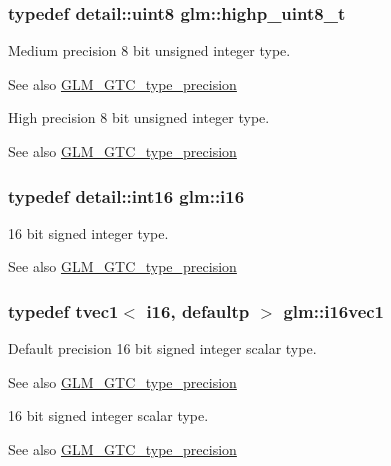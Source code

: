 \subsubsection[{highp\+\_\+uint8\+\_\+t}]{\setlength{\rightskip}{0pt plus 5cm}typedef {\bf detail\+::uint8} {\bf glm\+::highp\+\_\+uint8\+\_\+t}}\label{group__gtc__type__precision_ga9ba529fcc75b82d23da979f0ce6e4518}
Medium precision 8 bit unsigned integer type. \begin{DoxySeeAlso}{See also}
\hyperlink{group__gtc__type__precision}{G\+L\+M\+\_\+\+G\+T\+C\+\_\+type\+\_\+precision}
\end{DoxySeeAlso}
High precision 8 bit unsigned integer type. \begin{DoxySeeAlso}{See also}
\hyperlink{group__gtc__type__precision}{G\+L\+M\+\_\+\+G\+T\+C\+\_\+type\+\_\+precision} 
\end{DoxySeeAlso}
\hypertarget{group__gtc__type__precision_ga35e5542ca05b29cc256fdafb8503d1fd}{}
\subsubsection[{i16}]{\setlength{\rightskip}{0pt plus 5cm}typedef {\bf detail\+::int16} {\bf glm\+::i16}}\label{group__gtc__type__precision_ga35e5542ca05b29cc256fdafb8503d1fd}
16 bit signed integer type. \begin{DoxySeeAlso}{See also}
\hyperlink{group__gtc__type__precision}{G\+L\+M\+\_\+\+G\+T\+C\+\_\+type\+\_\+precision} 
\end{DoxySeeAlso}
\hypertarget{group__gtc__type__precision_gacec84a02174e44363dd105769fb22473}{}
\subsubsection[{i16vec1}]{\setlength{\rightskip}{0pt plus 5cm}typedef tvec1$<$ i16, defaultp $>$ {\bf glm\+::i16vec1}}\label{group__gtc__type__precision_gacec84a02174e44363dd105769fb22473}
Default precision 16 bit signed integer scalar type. \begin{DoxySeeAlso}{See also}
\hyperlink{group__gtc__type__precision}{G\+L\+M\+\_\+\+G\+T\+C\+\_\+type\+\_\+precision}
\end{DoxySeeAlso}
16 bit signed integer scalar type. \begin{DoxySeeAlso}{See also}
\hyperlink{group__gtc__type__precision}{G\+L\+M\+\_\+\+G\+T\+C\+\_\+type\+\_\+precision} 
\end{DoxySeeAlso}
\hypertarget{group__gtc__type__precision_ga37af364ff13fb791571dd324dfd3ca89}{}
